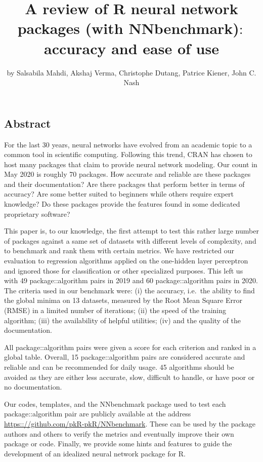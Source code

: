 \title{A review of R neural network packages (with NNbenchmark)\(:\) accuracy
and ease of use}
\author{by Salsabila Mahdi, Akshaj Verma, Christophe Dutang, Patrice Kiener, John C. Nash}

\maketitle


\hypertarget{abstract}{%
\subsection{Abstract}\label{abstract}}

For the last 30 years, neural networks have evolved from an academic
topic to a common tool in scientific computing. Following this trend,
CRAN has chosen to host many packages that claim to provide neural
network modeling. Our count in May 2020 is roughly 70 packages. How
accurate and reliable are these packages and their documentation? Are
there packages that perform better in terms of accuracy? Are some better
suited to beginners while others require expert knowledge? Do these
packages provide the features found in some dedicated proprietary
software?

This paper is, to our knowledge, the first attempt to test this rather
large number of packages against a same set of datasets with different
levels of complexity, and to benchmark and rank them with certain
metrics. We have restricted our evaluation to regression algorithms
applied on the one-hidden layer perceptron and ignored those for
classification or other specialized purposes. This left us with 49
package::algorithm pairs in 2019 and 60 package::algorithm pairs in
2020. The criteria used in our benchmark were: (i) the accuracy,
i.e.~the ability to find the global minima on 13 datasets, measured by
the Root Mean Square Error (RMSE) in a limited number of iterations;
(ii) the speed of the training algorithm; (iii) the availability of
helpful utilities; (iv) and the quality of the documentation.

All package::algorithm pairs were given a score for each criterion and
ranked in a global table. Overall, 15 package::algorithm pairs are
considered accurate and reliable and can be recommended for daily usage.
45 algorithms should be avoided as they are either less accurate, slow,
difficult to handle, or have poor or no documentation.

Our codes, templates, and the NNbenchmark package used to test each
package::algorithm pair are publicly available at the address
\url{https:://github.com/pkR-pkR/NNbenchmark}. These can be used by the
package authors and others to verify the metrics and eventually improve
their own package or code. Finally, we provide some hints and features
to guide the development of an idealized neural network package for R.


